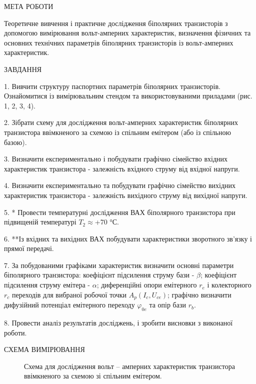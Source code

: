 \documentclass[a4paper,14pt]{extreport}
\begin{document}
\begin{center}МЕТА РОБОТИ\\ \end{center}

Теоретичне вивчення і практичне дослідження біполярних транзисторів з допомогою вимірювання вольт-амперних характеристик, визначення фізичних та основних технічних параметрів біполярних транзисторів із вольт-амперних характеристик.

\begin{center} ЗАВДАННЯ\\ \end{center}

1. Вивчити структуру паспортних параметрів біполярних транзисторів. Ознайомитися із
вимірювальним стендом та використовуваними приладами (рис. 1, 2, 3, 4).\par
2. Зібрати схему для дослідження вольт-амперних характеристик біполярних транзистора
ввімкненого за схемою із спільним емітером (або із спільною базою).\par
3. Визначити експериментально і побудувати графічно сімейство вхідних характеристик
транзистора - залежність вхідного струму від вхідної напруги.\par
4. Визначити експериментально та побудувати графічно сімейство вихідних характеристик
транзистора - залежність вихідного струму від вихідної напруги.\par
5. * Провести температурні дослідження ВАХ біполярного транзистора при підвищеній
температурі $T_2 \approx$+70 °С.\par
6. **Із вхідних та вихідних ВАХ побудувати характеристики зворотного зв'язку і прямої
передачі.\par
7. За побудованими графіками характеристик визначити основні параметри біполярного
транзистора: коефіцієнт підсилення струму бази - $\beta$; коефіцієнт підсилення струму емітера - $\alpha$; диференційні опори емітерного $r_e$ і колекторного $r_c$ переходів для вибраної робочої точки $A_p(I_c, U_{ce})$; графічно визначити дифузійний потенціал емітерного переходу $\varphi_{0e}$ та опір бази $r_b$.\par
8. Провести аналіз результатів досліджень, і зробити висновки з виконаної роботи.\par


\newpage
\begin{center}СХЕМА ВИМІРЮВАННЯ\\ \end{center}
\begin{figure}[h]
\caption{Схема для дослідження вольт – амперних характеристик транзистора ввімкненого за схемою зі спільним емітером.}
\label{ris:image01}
\end{figure}
\end{document}
